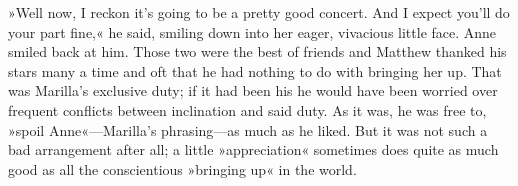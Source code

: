 »Well now, I reckon it's going to be a pretty good concert. And I expect you'll do your part fine,« he said, smiling down into her eager, vivacious little face. Anne smiled back at him. Those two were the best of friends and Matthew thanked his stars many a time and oft that he had nothing to do with bringing her up. That was Marilla's exclusive duty; if it had been his he would have been worried over frequent conflicts between inclination and said duty. As it was, he was free to, »spoil Anne«—Marilla's phrasing—as much as he liked. But it was not such a bad arrangement after all; a little »appreciation« sometimes does quite as much good as all the conscientious »bringing up« in the world.